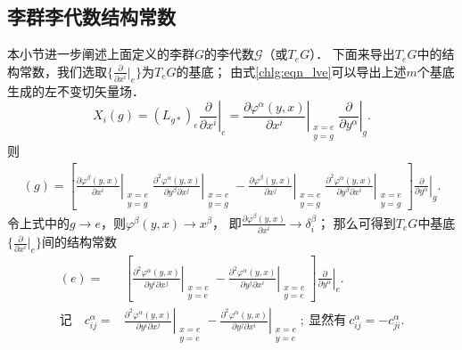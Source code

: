 

\subsection{李群李代数结构常数}\label{chlg:sec_structure-constants}
本小节进一步阐述上面定义的李群$G$的李代数$\mathscr{G}$（或$T_eG$）．
下面来导出$T_eG$中的结构常数，我们选取$\{\frac{\partial}{\partial x^i}|_{e}\}$为$T_eG$的基底；
由式\eqref{chlg:eqn_lve}可以导出上述$m$个基底生成的左不变切矢量场．
\begin{equation}
    X_i(g)=(L_{g*})_e \left.\frac{\partial }{\partial x^i}\right|_e 
    = \left. \frac{\partial \varphi^\alpha (y,x)}{\partial x^i} 
    \right|_{\substack{x=e\\y=g}}  \left. \frac{\partial}{\partial y^\alpha}\right|_{g} .
\end{equation}
则
\begin{align*}
    [X_i, X_j](g)= \left[ \left. \frac{\partial \varphi^\beta (y,x)}{\partial x^i} \right| _{\substack{x=e\\y=g}}
    \left. \frac{\partial^2 \varphi^\alpha (y,x)}{\partial y^\beta \partial x^j} \right|_{\substack{x=e\\y=g}} 
    -\left. \frac{\partial \varphi^\beta (y,x)}{\partial x^j} \right| _{\substack{x=e\\y=g}}
    \left. \frac{\partial^2 \varphi^\alpha (y,x)}{\partial y^\beta \partial x^i} \right|_{\substack{x=e\\y=g}} 
    \right] \left. \frac{\partial}{\partial y^\alpha}\right|_{g} .
\end{align*}  %
令上式中的$g\to e$，则$\varphi^\beta(y,x) \to x^\beta$，
即$\frac{\partial \varphi^\beta (y,x)}{\partial x^i}\to \delta^\beta_i$；
那么可得到$T_eG$中基底$\{\frac{\partial}{\partial x^i}|_{e}\}$间的结构常数
\begin{align}
    [X_i, X_j](e)=& \left[ \left. \frac{\partial^2 \varphi^\alpha (y,x)}{\partial y^i \partial x^j} \right|_{\substack{x=e\\y=e}} 
    -\left. \frac{\partial^2 \varphi^\alpha (y,x)}{\partial y^j \partial x^i} \right|_{\substack{x=e\\y=e}} 
    \right] \left. \frac{\partial}{\partial y^\alpha}\right|_{e} . \\
    \text{记}\quad 
    c^\alpha_{ij}=&\left. \frac{\partial^2 \varphi^\alpha (y,x)}{\partial y^i \partial x^j} \right|_{\substack{x=e\\y=e}} -\left. 
    \frac{\partial^2 \varphi^\alpha (y,x)}{\partial y^j \partial x^i} \right|_{\substack{x=e\\y=e}};
    \ \text{显然有}\  c^\alpha_{ij} = -c^\alpha_{ji} .\label{chlg:eqn_struc-const}
\end{align}


